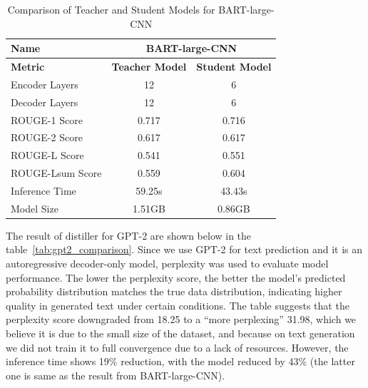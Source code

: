 \documentclass{article}
\begin{document}
    \begin{table}[h!]
        \centering
        \begin{tabular}{lcc}
            \toprule
            \textbf{Name}         & \multicolumn{2}{c}{\textbf{BART-large-CNN}} \\ \midrule
            \textbf{Metric}       & \textbf{Teacher Model} & \textbf{Student Model} \\ \midrule
            Encoder Layers        & 12                     & 6                     \\
            Decoder Layers        & 12                     & 6                     \\
            ROUGE-1 Score         & 0.717                  & 0.716                  \\
            ROUGE-2 Score         & 0.617                  & 0.617                  \\
            ROUGE-L Score         & 0.541                  & 0.551                  \\
            ROUGE-Lsum Score      & 0.559                  & 0.604                  \\
            Inference Time        & 59.25s                 & 43.43s                 \\
            Model Size            & 1.51GB                 & 0.86GB                 \\ \bottomrule
        \end{tabular}
        \caption{Comparison of Teacher and Student Models for BART-large-CNN}
        \label{tab:BART_comparison}
    \end{table}

    \hspace*{1em} The result of distiller for GPT-2 are shown below in the table~\ref{tab:gpt2_comparison}. Since we use GPT-2 for text prediction and it is an autoregressive decoder-only model, perplexity was used to evaluate model performance. The lower the perplexity score, the better the model's predicted probability distribution matches the true data distribution, indicating higher quality in generated text under certain conditions. The table suggests that the perplexity score downgraded from 18.25 to a ``more perplexing'' 31.98, which we believe it is due to the small size of the dataset, and because on text generation we did not train it to full convergence due to a lack of resources. However, the inference time shows 19\% reduction, with the model reduced by 43\% (the latter one is same as the result from BART-large-CNN).
\end{document}
